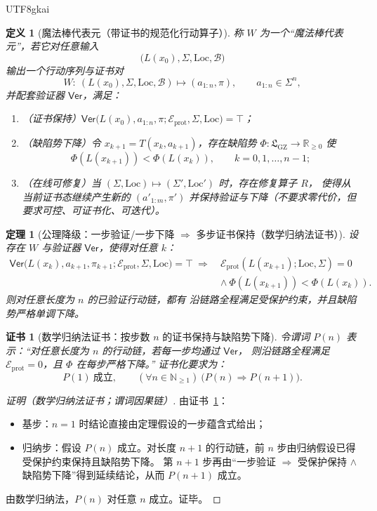 \documentclass[12pt]{article}
\newtheorem{definition}{定义}[section]
\newtheorem{theorem}{定理}[section]
\newtheorem{Certificate}{证书}[section]
\newcommand{\RR}{\mathbb{R}}
\newcommand{\NN}{\mathbb{N}}
\newcommand{\GZLS}{\ensuremath{\mathfrak{L}_{\mathrm{GZ}}}}
\begin{document}
\begin{CJK*}{UTF8}{gkai}
\begin{definition}[魔法棒代表元（带证书的规范化行动算子）]
\label{def:magic-wand-representative}
称 $W$ 为一个“魔法棒代表元”，若它对任意输入
\[
  \bigl(L(x_0),\Sigma,\mathrm{Loc},\mathcal{B}\bigr)
\]
输出一个行动序列与证书对
\[
  W:\ (L(x_0),\Sigma,\mathrm{Loc},\mathcal{B})\longmapsto (a_{1:n},\pi),
  \qquad a_{1:n}\in \Sigma^n,
\]
并配套验证器 $\mathsf{Ver}$，满足：
\begin{enumerate}
  \item （证书保持）$\mathsf{Ver}\bigl(L(x_0),a_{1:n},\pi;\mathcal{E}_{\mathrm{prot}},\Sigma,\mathrm{Loc}\bigr)=\top$；
  \item （缺陷势下降）令 $x_{k+1}=T(x_k,a_{k+1})$，存在缺陷势 $\Phi:\GZLS\to\RR_{\ge 0}$ 使
  \[
    \Phi(L(x_{k+1}))<\Phi(L(x_k)),\qquad k=0,1,\dots,n-1;
  \]
  \item （在线可修复）当 $(\Sigma,\mathrm{Loc})\mapsto(\Sigma',\mathrm{Loc}')$ 时，存在修复算子 $R$，
  使得从当前证书态继续产生新的 $(a'_{1:m},\pi')$ 并保持验证与下降（不要求零代价，但要求可控、可证书化、可迭代）。
\end{enumerate}
\end{definition}

\begin{theorem}[公理降级：一步验证/一步下降 $\Rightarrow$ 多步证书保持（数学归纳法证书）]
\label{thm:wand-multistep-verification-induction}
设存在 $W$ 与验证器 $\mathsf{Ver}$，使得对任意 $k$：
\[
  \begin{aligned}
    \mathsf{Ver}\bigl(L(x_k),a_{k+1},\pi_{k+1};\mathcal{E}_{\mathrm{prot}},\Sigma,\mathrm{Loc}\bigr)=\top
    \ \Longrightarrow\
    &\mathcal{E}_{\mathrm{prot}}(L(x_{k+1});\mathrm{Loc},\Sigma)=0\\
    &\wedge\ \Phi(L(x_{k+1}))<\Phi(L(x_k)).
  \end{aligned}
\]
则对任意长度为 $n$ 的已验证行动链，都有
沿链路全程满足受保护约束，并且缺陷势严格单调下降。
\end{theorem}

\begin{Certificate}[数学归纳法证书：按步数 $n$ 的证书保持与缺陷势下降]
\label{cert:wand-multistep-verification-induction}
令谓词 $P(n)$ 表示：“对任意长度为 $n$ 的行动链，若每一步均通过 $\mathsf{Ver}$，
则沿链路全程满足 $\mathcal{E}_{\mathrm{prot}}=0$，且 $\Phi$ 在每步严格下降。”
证书化要求为：
\[
  P(1)\ \text{成立},\qquad
  (\forall n\in\NN_{\ge 1})\ \bigl(P(n)\Rightarrow P(n+1)\bigr).
\]
\end{Certificate}

\begin{proof}[证明（数学归纳法证书；谓词因果链）]
由证书~\ref{cert:wand-multistep-verification-induction}：
\begin{itemize}
  \item 基步：$n=1$ 时结论直接由定理假设的一步蕴含式给出；
  \item 归纳步：假设 $P(n)$ 成立。对长度 $n+1$ 的行动链，前 $n$ 步由归纳假设已得受保护约束保持且缺陷势下降。
  第 $n+1$ 步再由“一步验证 $\Rightarrow$ 受保护保持 $\wedge$ 缺陷势下降”得到延续结论，从而 $P(n+1)$ 成立。
\end{itemize}
由数学归纳法，$P(n)$ 对任意 $n$ 成立。证毕。
\end{proof}


\end{CJK*}
\end{document}
